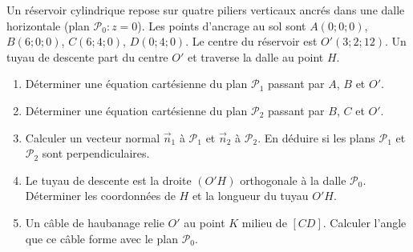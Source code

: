 \documentclass[11pt]{article}
\begin{document}
\begin{exercice}
Un réservoir cylindrique repose sur quatre piliers verticaux ancrés dans une dalle horizontale (plan $\mathcal{P}_0 : z = 0$). 
Les points d'ancrage au sol sont $A(0;0;0)$, $B(6;0;0)$, $C(6;4;0)$, $D(0;4;0)$. 
Le centre du réservoir est $O'(3;2;12)$. Un tuyau de descente part du centre $O'$ et traverse la dalle au point $H$.
\begin{enumerate}
    \item Déterminer une équation cartésienne du plan $\mathcal{P}_1$ passant par $A$, $B$ et $O'$.
    \item Déterminer une équation cartésienne du plan $\mathcal{P}_2$ passant par $B$, $C$ et $O'$.
    \item Calculer un vecteur normal $\vec n_1$ à $\mathcal{P}_1$ et $\vec n_2$ à $\mathcal{P}_2$. 
    En déduire si les plans $\mathcal{P}_1$ et $\mathcal{P}_2$ sont perpendiculaires.
    \item Le tuyau de descente est la droite $(O'H)$ orthogonale à la dalle $\mathcal{P}_0$. 
    Déterminer les coordonnées de $H$ et la longueur du tuyau $O'H$.
    \item Un câble de haubanage relie $O'$ au point $K$ milieu de $[CD]$. 
    Calculer l'angle que ce câble forme avec le plan $\mathcal{P}_0$.
\end{enumerate}
\end{exercice}
\end{document}
